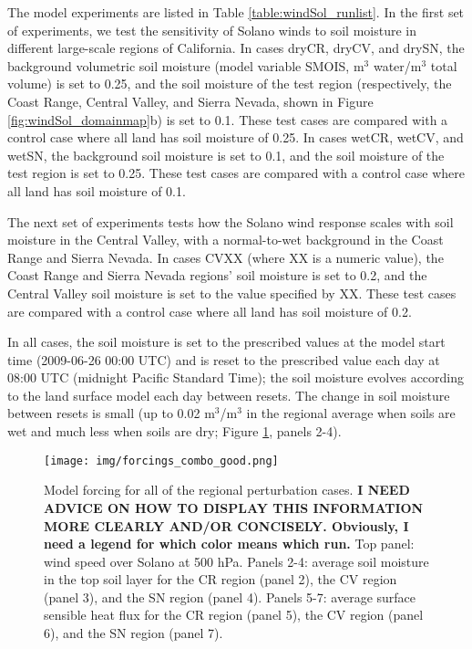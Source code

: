 The model experiments are listed in Table \ref{table:windSol_runlist}.  In the first set of experiments, we test the sensitivity of Solano winds to soil moisture in different large-scale regions of California.  In cases dryCR, dryCV, and drySN, the background volumetric soil moisture (model variable SMOIS, m$^3$ water/m$^3$ total volume) is set to 0.25, and the soil moisture of the test region (respectively, the Coast Range, Central Valley, and Sierra Nevada, shown in Figure \ref{fig:windSol_domainmap}b) is set to 0.1.  These test cases are compared with a control case where all land has soil moisture of 0.25.  In cases wetCR, wetCV, and wetSN, the background soil moisture is set to 0.1, and the soil moisture of the test region is set to 0.25.  These test cases are compared with a control case where all land has soil moisture of 0.1.

The next set of experiments tests how the Solano wind response scales with soil moisture in the Central Valley, with a normal-to-wet background in the Coast Range and Sierra Nevada.  In cases CVXX (where XX is a numeric value), the Coast Range and Sierra Nevada regions' soil moisture is set to 0.2, and the Central Valley soil moisture is set to the value specified by XX.  These test cases are compared with a control case where all land has soil moisture of 0.2.

In all cases, the soil moisture is set to the prescribed values at the model start time (2009-06-26 00:00 UTC) and is reset to the prescribed value each day at 08:00 UTC (midnight Pacific Standard Time); the soil moisture evolves according to the land surface model each day between resets.  The change in soil moisture between resets is small (up to 0.02 m$^3$/m$^3$ in the regional average when soils are wet and much less when soils are dry; Figure \ref{fig:windSol_forcings}, panels 2-4).

\begin{figure}[here]
\texttt{[image: img/forcings\_combo\_good.png]}
\caption{Model forcing for all of the regional perturbation cases.  \textbf{I NEED ADVICE ON HOW TO DISPLAY THIS INFORMATION MORE CLEARLY AND/OR CONCISELY. Obviously, I need a legend for which color means which run.}  Top panel: wind speed over Solano at 500 hPa.  Panels 2-4: average soil moisture in the top soil layer for the CR region (panel 2), the CV region (panel 3), and the SN region (panel 4).  Panels 5-7: average surface sensible heat flux for the CR region (panel 5), the CV region (panel 6), and the SN region (panel 7).}
\label{fig:windSol_forcings}
\end{figure}

